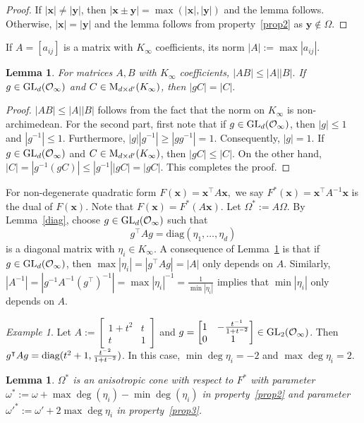 \documentclass[10pt]{amsart}
\theoremstyle{plain}
\theoremstyle{plain}
\newtheorem{lemma}[theorem]{Lemma}
\renewcommand{\vec}[1]{\mathbf{#1}}
\theoremstyle{remark}
\newtheorem{example}[theorem]{Example}
\theoremstyle{definition}
\newcommand{\diag}{\textup{diag}}
\newcommand{\Ki}{K_\infty}
\newcommand{\GL}{\textup{GL}}
\begin{document}
\begin{proof}
If $|\vec{x}|\neq |\vec{y}|$, then $|\vec{x}\pm \vec{y}|=\max(|\vec{x}|,|\vec{y}|)$ and the lemma follows. Otherwise, $|\vec{x}|=|\vec{y}|$ and 
the lemma follows from property~\eqref{prop2} as $\vec{y}\notin \Omega$.  
\end{proof}
If $A=[a_{ij}]$ is a matrix with $\Ki$ coefficients, its norm $|A|:=\max|a_{ij}|$. 
\begin{lemma}\label{opnorm}
For matrices $A,B$ with $\Ki$ coefficients, $|AB|\leq |A||B|.$ If $g\in\GL_d(\mathcal{O}_{\infty})$ and $C\in \textup{M}_{d\times d'}(\Ki)$, then $|gC|=|C|.$
\end{lemma}
\begin{proof}$|AB|\leq |A||B|$ follows from the fact that the norm on $\Ki$ is non-archimedean. For the second part, first note that if $g\in\GL_d(\mathcal{O}_{\infty})$, then $|g|\leq 1$ and $|g^{-1}|\leq 1$. Furthermore, $|g||g^{-1}|\geq |gg^{-1}|=1$. Consequently, $|g|=1$. If $g\in\GL_d(\mathcal{O}_{\infty})$ and $C\in \textup{M}_{d\times d'}(\Ki)$, then $|gC|\leq |C|$. On the other hand, $|C|=|g^{-1}(gC)|\leq |g^{-1}||gC|=|gC|$. This completes the proof.
\end{proof}
For non-degenerate quadratic form $F(\vec{x})=\vec{x}^{\intercal}A\vec{x},$ we say $F^{*}(\vec{x})=\vec{x}^{\intercal}A^{-1}\vec{x}$ is the dual of $F(\vec{x}).$ Note that $F(\vec{x})=F^*(A\vec{x}).$ Let $\Omega^*:=A\Omega.$ By Lemma~\ref{diag}, choose $g\in\GL_d(\mathcal{O}_{\infty})$ such that 
\[
g^{\intercal}Ag=\text{diag}(\eta_1,\dots,\eta_d)
\]
is a diagonal matrix with $\eta_i\in\Ki$. A consequence of Lemma~\ref{opnorm} is that if $g\in\GL_d(\mathcal{O}_{\infty})$, then $\max|\eta_i|=|g^{\intercal}Ag|=|A|$ only depends on $A$. Similarly, $|A^{-1}|=|g^{-1}A^{-1}(g^{\intercal})^{-1}|=\max|\eta_i|^{-1}=\frac{1}{\min|\eta_i|}$ implies that $\min|\eta_i|$ only depends on $A$.
\begin{example}
Let $A:=\begin{bmatrix}1+t^2& t\\ t& 1\end{bmatrix}$ and  $g=\begin{bmatrix}1& -\frac{t^{-1}}{1+t^{-2}}\\ 0& 1\end{bmatrix}\in\GL_2(\mathcal{O}_{\infty})$. Then $g^{\intercal}Ag=\diag(t^2+1,\frac{t^{-2}}{1+t^{-2}})$. In this case, $\min\deg\eta_i=-2$ and $\max\deg\eta_i=2$.
\end{example}
\begin{lemma}\label{dualcone}
  $\Omega^*$ is an anisotropic cone with respect to $F^*$ with parameter $\omega^*:=\omega+\max\deg(\eta_i)-\min\deg(\eta_i)$ in property~\eqref{prop2} and parameter $\omega'^*:=\omega'+2\max\deg\eta_i$ in property~\eqref{prop3}. 
\end{lemma}
\end{document}
